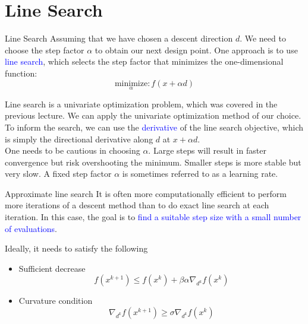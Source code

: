 \documentclass{beamer}
\begin{document}
\section{Line Search}
\begin{frame}{Line Search}
Assuming that we have chosen a descent direction $d$. We need to choose the step factor $\alpha$ to obtain our next design point. One approach is to use \textcolor{blue}{line search}, which selects the step factor that minimizes the one-dimensional function:
\begin{equation*}
    \underset{\alpha}{\textrm{minimize}}: f(x+\alpha d)
\end{equation*}

Line search is a univariate optimization problem, which was covered in the previous lecture. We can apply the univariate optimization method of our choice. To inform the search, we can use the \textcolor{blue}{derivative} of the line search objective, which is simply the directional derivative along $d$ at $x + \alpha d$.\\

One needs to be cautious in choosing $\alpha$. Large steps will result in faster convergence but risk overshooting the minimum. Smaller steps is more stable but very slow. A fixed step factor $\alpha$ is sometimes referred to as a learning rate.

\end{frame}


\begin{frame}{Approximate line search}
It is often more computationally efficient to perform more iterations of a descent method than to do exact line search at each iteration. In this case, the goal is to \textcolor{blue}{find a suitable step size with a small number of evaluations}.

Ideally, it needs to satisfy the following

\begin{itemize}
    \item Sufficient decrease
    \begin{equation*}
        f(x^{k+1}) \leq f(x^k) + \beta\alpha \nabla _{d^k} f(x^k)
    \end{equation*}
    \item Curvature condition
    \begin{equation*}
        \nabla _{d^k} f(x^{k+1}) \geq \sigma \nabla _{d^k} f(x^k)
    \end{equation*}
\end{itemize}


\end{frame}
\end{document}
